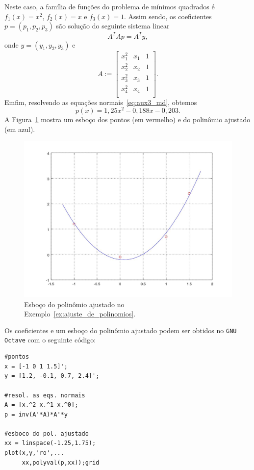 \begin{ex}
  Neste caso, a família de funções do problema de mínimos quadrados é $f_1(x) = x^2$, $f_2(x) = x$ e $f_3(x) = 1$. Assim sendo, os coeficientes $p = (p_1, p_2, p_3)$ são solução do seguinte sistema linear
  \begin{equation}\label{eq:aux3_md}
    A^TAp = A^Ty,
  \end{equation}
onde $y = (y_1, y_2, y_3)$ e
\begin{equation}
  A :=
  \begin{bmatrix}
    x_1^2 & x_1 & 1 \\
    x_2^2 & x_2 & 1 \\
    x_3^2 & x_3 & 1 \\
    x_4^2 & x_4 & 1 \\
  \end{bmatrix}.
\end{equation}
Emfim, resolvendo as equações normais~\eqref{eq:aux3_md}, obtemos
\begin{equation}
  p(x) = 1,25x^2 -0,188x - 0,203.
\end{equation}
A Figura~\ref{fig:ex_mq_poli} mostra um esboço dos pontos (em vermelho) e do polinômio ajustado (em azul).

\begin{figure}[h]
  \centering
  \includegraphics[width=\textwidth]{cap_ajuste/figs/ex_mq_poli/ex_mq_poli}
  \caption{Esboço do polinômio ajustado no Exemplo~\ref{ex:ajuste_de_polinomios}.}
  \label{fig:ex_mq_poli}
\end{figure}

\ifisoctave
Os coeficientes e um esboço do polinômio ajustado podem ser obtidos no \verb+GNU Octave+ com o seguinte código:
\begin{verbatim}
#pontos
x = [-1 0 1 1.5]';
y = [1.2, -0.1, 0.7, 2.4]';

#resol. as eqs. normais
A = [x.^2 x.^1 x.^0];
p = inv(A'*A)*A'*y

#esboco do pol. ajustado
xx = linspace(-1.25,1.75);
plot(x,y,'ro',...
     xx,polyval(p,xx));grid
\end{verbatim}
\fi

\end{ex}


